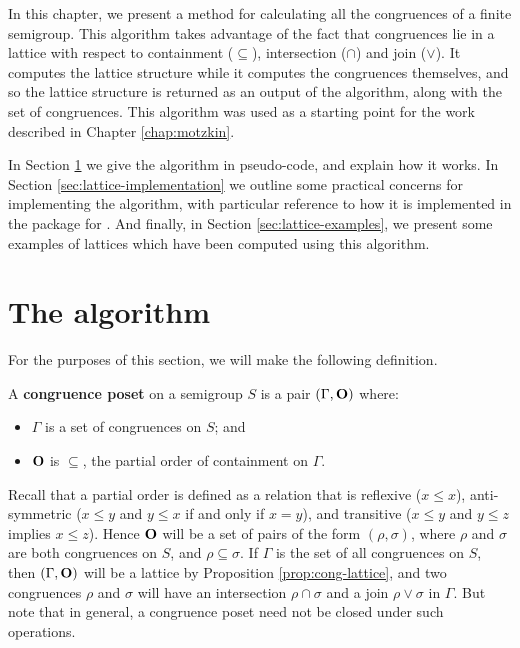 In this chapter, we present a method for calculating all the congruences of a
finite semigroup.  This algorithm takes advantage of the fact that congruences
lie in a lattice with respect to containment ($\subseteq$), intersection
($\cap$) and join ($\vee$).  It computes the lattice structure while it computes
the congruences themselves, and so the lattice structure is returned as an
output of the algorithm, along with the set of congruences.  This algorithm was
used as a starting point for the work described in Chapter \ref{chap:motzkin}.

In Section \ref{sec:lattice-algorithm} we give the algorithm in pseudo-code, and
explain how it works.  In Section \ref{sec:lattice-implementation} we outline
some practical concerns for implementing the algorithm, with particular
reference to how it is implemented in the \Semigroups{} package \cite{semigroups}
for \GAP{} \cite{gap}.  And finally, in Section \ref{sec:lattice-examples}, we
present some examples of lattices which have been computed using this algorithm.

\section{The algorithm}
\label{sec:lattice-algorithm}

For the purposes of this section, we will make the following definition.

\begin{definition}
  \label{def:congruence-poset}
  A \textbf{congruence poset} on a semigroup $S$ is a pair $(\Gamma, \mathbf{O})$
  where:
  \begin{itemize}
  \item $\Gamma$ is a set of congruences on $S$; and
  \item $\mathbf{O}$ is $\subseteq$, the partial order of containment on $\Gamma$.
  \end{itemize}
\end{definition}

Recall that a partial order is defined as a relation that is reflexive
($x \leq x$), anti-symmetric ($x \leq y$ and $y \leq x$ if and only if $x = y$),
and transitive ($x \leq y$ and $y \leq z$ implies $x \leq z$).
Hence $\mathbf{O}$ will be a set of pairs of the form $(\rho, \sigma)$, where $\rho$
and $\sigma$ are both congruences on $S$, and $\rho \subseteq \sigma$.  If
$\Gamma$ is the set of all congruences on $S$, then $(\Gamma, \mathbf{O})$ will be a
lattice by Proposition \ref{prop:cong-lattice}, and two congruences $\rho$ and
$\sigma$ will have an intersection $\rho \cap \sigma$ and a join
$\rho \vee \sigma$ in $\Gamma$.  But note that in general, a congruence poset
need not be closed under such operations.

